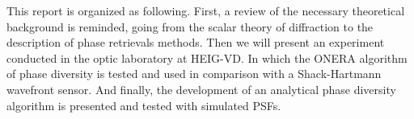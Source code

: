 \vspace{1cm}
This report is organized as following. First, a review of the necessary theoretical background is reminded, going from the scalar theory of diffraction to the description of phase retrievals methods. Then we will present an experiment conducted in the optic laboratory at HEIG-VD. In which the ONERA algorithm of phase diversity is tested and used in comparison with a Shack-Hartmann wavefront sensor. And finally, the development of an analytical phase diversity algorithm is presented and tested with simulated PSFs.